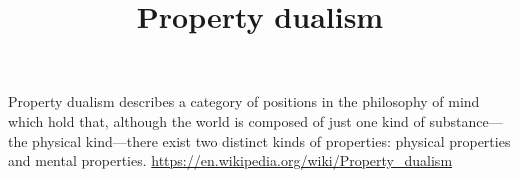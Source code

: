 \documentclass[a4paper]{article}
\title{Property dualism}
\date{}
\begin{document}
    \maketitle

    Property dualism describes a category of positions in the philosophy of mind which hold that, although the world is composed of just one kind of substance—the physical kind—there exist two distinct kinds of properties: physical properties and mental properties.
    \url{https://en.wikipedia.org/wiki/Property_dualism}
\end{document}
